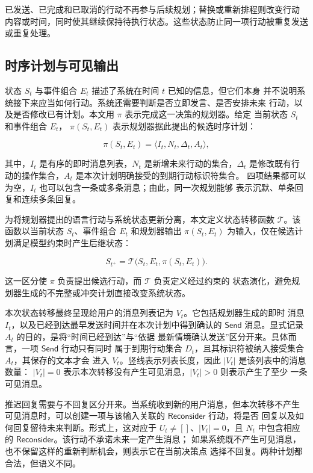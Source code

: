 \documentclass[manuscript,nonacm]{acmart}
\begin{document}
已发送、已完成和已取消的行动不再参与后续规划；替换或重新排程则改变行动
内容或时间，同时使其继续保持待执行状态。这些状态防止同一项行动被重复发送
或重复处理。

\subsection{时序计划与可见输出}

状态 $S_t$ 与事件组合 $E_t$ 描述了系统在时间 $t$ 已知的信息，但它们本身
并不说明系统接下来应当如何行动。系统还需要判断是否立即发言、是否安排未来
行动，以及是否修改已有计划。本文用 $\pi$ 表示完成这一决策的规划器。给定
当前状态 $S_t$ 和事件组合 $E_t$，
$\pi(S_t,E_t)$ 表示规划器据此提出的候选时序计划：

\begin{equation}
\pi(S_t,E_t)=\langle I_t,N_t,\Delta_t,A_t\rangle,
\end{equation}

其中，$I_t$ 是有序的即时消息列表，$N_t$ 是新增未来行动的集合，$\Delta_t$
是修改既有行动的操作集合，$A_t$ 是本次计划明确接受的到期行动标识符集合。
四项结果都可以为空，$I_t$ 也可以包含一条或多条消息；由此，同一次规划能够
表示沉默、单条回复和连续多条回复。

为将规划器提出的语言行动与系统状态更新分离，本文定义状态转移函数
$\mathcal{T}$。该函数以当前状态 $S_t$、事件组合 $E_t$ 和规划器输出
$\pi(S_t,E_t)$ 为输入，仅在候选计划满足模型约束时产生后继状态：

\begin{equation}
S_{t^+}=\mathcal{T}\bigl(S_t,E_t,\pi(S_t,E_t)\bigr).
\end{equation}

这一区分使 $\pi$ 负责提出候选行动，而 $\mathcal{T}$ 负责定义经过约束的
状态演化，避免规划器生成的不完整或冲突计划直接改变系统状态。

本次状态转移最终呈现给用户的消息列表记为 $V_t$。它包括规划器生成的即时
消息 $I_t$，以及已经到达最早发送时间并在本次计划中得到确认的
$\mathsf{Send}$ 消息。显式记录 $A_t$ 的目的，是将“时间已经到达”与“依据
最新情境确认发送”区分开来。具体而言，一项 $\mathsf{Send}$ 行动只有同时
属于到期行动集合 $D_t$，且其标识符被纳入接受集合 $A_t$，其保存的文本才会
进入 $V_t$。竖线表示列表长度，因此 $|V_t|$ 是该列表中的消息数量：
$|V_t|=0$ 表示本次转移没有产生可见消息，$|V_t|>0$ 则表示产生了至少
一条可见消息。

推迟回复需要与不回复区分开来。当系统收到新的用户消息，但本次转移不产生
可见消息时，可以创建一项与该输入关联的 $\mathsf{Reconsider}$ 行动，将是否
回复以及如何回复留待未来判断。形式上，这对应于 $U_t\neq[]$、$|V_t|=0$，且
$N_t$ 中包含相应的 $\mathsf{Reconsider}$。该行动不承诺未来一定产生消息；
如果系统既不产生可见消息，也不保留这样的重新判断机会，则表示它在当前决策点
选择不回复。两种计划都合法，但语义不同。
\end{document}
